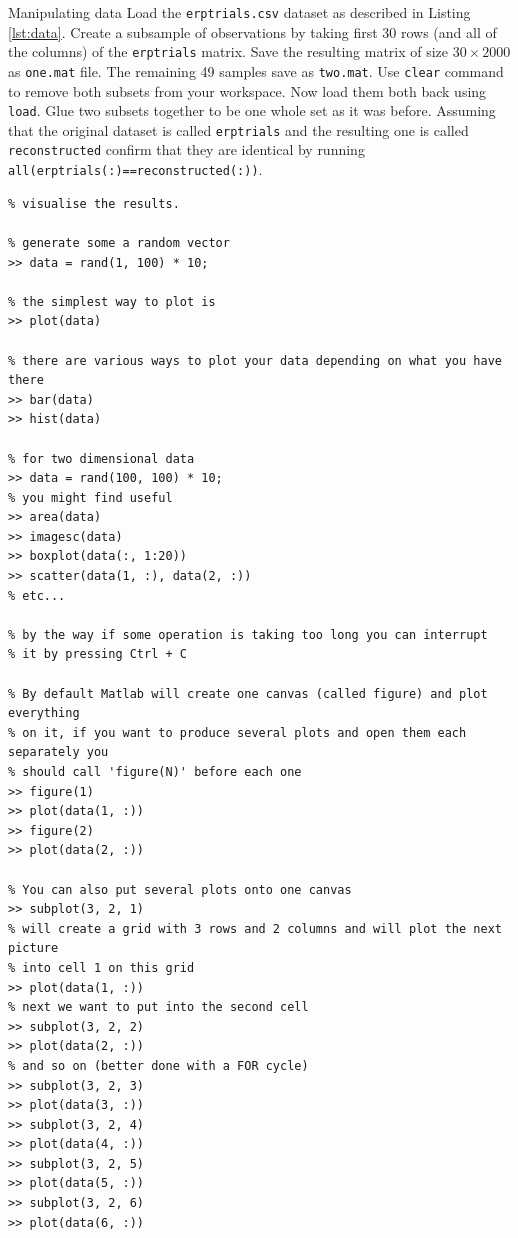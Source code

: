 \documentclass[a4paper,11pt]{article}
\begin{document}
%
%
\begin{exercise}{2}{Manipulating data}{}
Load the \texttt{erptrials.csv} dataset as described in Listing \ref{lst:data}. Create a subsample of observations by taking first 30 rows (and all of the columns) of the \texttt{erptrials} matrix. Save the resulting matrix of size $30 \times 2000$ as \texttt{one.mat} file. The remaining 49 samples save as \texttt{two.mat}. Use \texttt{clear} command to remove both subsets from your workspace. Now load them both back using \texttt{load}. Glue two subsets together to be one whole set as it was before. Assuming that the original dataset is called \texttt{erptrials} and the resulting one is called \texttt{reconstructed} confirm that they are identical by running \texttt{all(erptrials(:)==reconstructed(:))}.
\end{exercise}


%
%
\begin{lstlisting}[caption={Plotting}]
% One of the most important abilities in any data analysis task is the ability to
% visualise the results.

% generate some a random vector
>> data = rand(1, 100) * 10;

% the simplest way to plot is
>> plot(data)

% there are various ways to plot your data depending on what you have there
>> bar(data)
>> hist(data)

% for two dimensional data
>> data = rand(100, 100) * 10;
% you might find useful
>> area(data)
>> imagesc(data)
>> boxplot(data(:, 1:20))
>> scatter(data(1, :), data(2, :))
% etc...

% by the way if some operation is taking too long you can interrupt
% it by pressing Ctrl + C

% By default Matlab will create one canvas (called figure) and plot everything
% on it, if you want to produce several plots and open them each separately you
% should call 'figure(N)' before each one
>> figure(1)
>> plot(data(1, :))
>> figure(2)
>> plot(data(2, :))

% You can also put several plots onto one canvas
>> subplot(3, 2, 1)
% will create a grid with 3 rows and 2 columns and will plot the next picture
% into cell 1 on this grid
>> plot(data(1, :))
% next we want to put into the second cell
>> subplot(3, 2, 2)
>> plot(data(2, :))
% and so on (better done with a FOR cycle)
>> subplot(3, 2, 3)
>> plot(data(3, :))
>> subplot(3, 2, 4)
>> plot(data(4, :))
>> subplot(3, 2, 5)
>> plot(data(5, :))
>> subplot(3, 2, 6)
>> plot(data(6, :))

\end{lstlisting}
\end{document}
